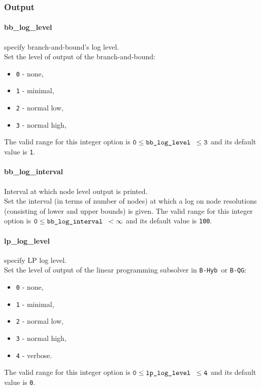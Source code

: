 \subsubsection{Output}
\label{app:opt_loglevel}
\paragraph{bb\_log\_level} specify branch-and-bound's log level. \\
 Set the level of output of the branch-and-bound:
 \begin{itemize}
  \item {\tt 0} - none,
  \item {\tt 1} - minimal,
  \item {\tt 2} - normal low,
  \item {\tt 3} - normal high,
  \end{itemize}
 The valid range for this integer option is
 ${\tt 0} \le \hbox{\tt bb\_log\_level } \le {\tt 3}$
and its default value is {\tt 1}.


\paragraph{bb\_log\_interval} Interval at which node level output is printed. \\
 Set the interval (in terms of number of nodes) at
which a log on node resolutions (consisting of
lower and upper bounds) is given. The valid range for this integer option is
${\tt 0} \le \hbox{\tt bb\_log\_interval } <  \infty$
and its default value is {\tt 100}.


\paragraph{lp\_log\_level} specify LP log level. \\
 Set the level of output of the linear programming
subsolver in {\tt B-Hyb }or {\tt B-QG}:
 \begin{itemize}
  \item {\tt 0} - none,
  \item {\tt 1} - minimal,
  \item {\tt 2} - normal low,
  \item {\tt 3} - normal high,
  \item {\tt 4} - verbose.
  \end{itemize}
The valid range for this integer option is
${\tt 0} \le \hbox{\tt lp\_log\_level } \le {\tt 4}$
and its default value is {\tt 0}.

